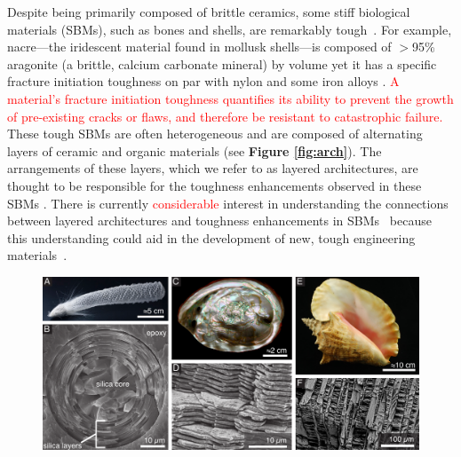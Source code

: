 \documentclass[12pt,onecolumn]{article}
\begin{document}
\linenumbers
\begin{bibunit}
\doublespacing
Despite being primarily composed of brittle ceramics, some stiff biological materials (SBMs), such as bones and shells, are remarkably tough~\cite{ritchie2011conflicts, wegst2015bioinspired, wang2001, gao2017mass}. For example, nacre---the iridescent material found in mollusk shells---is composed of $>$95\% aragonite (a brittle, calcium carbonate mineral) by volume yet it has a specific fracture initiation toughness on par with nylon and some iron alloys \cite{gao2017mass}. \textcolor{red}{A material's fracture initiation toughness quantifies its ability to prevent the growth of pre-existing cracks or flaws, and therefore be resistant to catastrophic failure.} These tough SBMs are often heterogeneous and are composed of alternating layers of ceramic and organic materials (see {\bf Figure \ref{fig:arch}}). The arrangements of these layers, which we refer to as layered architectures, are thought to be responsible for the toughness enhancements observed in these SBMs \cite{mayer2011new}. There is currently \textcolor{red}{considerable} interest in understanding the connections between layered architectures and toughness enhancements in SBMs~\cite{mayer2011new,mayer2005rigid,rabiei2010failure, kolednik2011bioinspired} because this understanding could aid in the development of new, tough engineering materials~\cite{munch2008tough,karambelas2013strombus,gao2017mass}.
%
			\begin{figure}[ht!]
			\centering
			\includegraphics[width=\textwidth]{../Figures/FigureArchEx/Figure1_V3.pdf}

\end{figure}
\end{bibunit}
\end{document}
